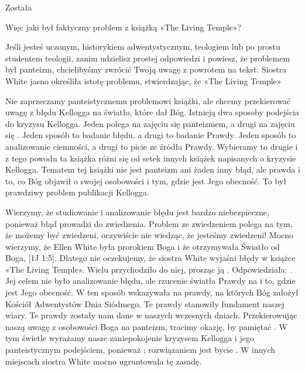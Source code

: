 Została 

Więc jaki był faktyczny problem z książką «The Living Temple»?

Jeśli jesteś uczonym, historykiem adwentystycznym, teologiem lub po prostu studentem teologii, zanim udzielisz prostej odpowiedzi i powiesz, że problemem był panteizm, chcielibyśmy zwrócić Twoją uwagę z powrotem na tekst. Siostra White jasno określiła istotę problemu, stwierdzając, że «The Living Temple» 

Nie zaprzeczamy panteistycznemu problemowi książki, ale chcemy przekierować uwagę z błędu Kellogga na światło, które dał Bóg. Istnieją dwa sposoby podejścia do kryzysu Kellogga. Jeden polega na zajęciu się panteizmem, a drugi na zajęciu się . Jeden sposób to badanie błędu, a drugi to badanie Prawdy. Jeden sposób to analizowanie ciemności, a drugi to picie ze źródła Prawdy. Wybieramy to drugie i z tego powodu ta książka różni się od setek innych książek napisanych o kryzysie Kellogga. Tematem tej książki nie jest panteizm ani żaden inny błąd, ale prawda i to, co Bóg objawił o swojej osobowości i tym, gdzie jest Jego obecność. To był prawdziwy problem publikacji Kellogga.

Wierzymy, że studiowanie i analizowanie błędu jest bardzo niebezpieczne, ponieważ błąd prowadzi do zwiedzenia. Problem ze zwiedzeniem polega na tym, że możemy być zwiedzeni, oczywiście nie wiedząc, że jesteśmy zwiedzeni! Mocno wierzymy, że Ellen White była prorokiem Boga i że otrzymywała Światło od Boga, [1J 1:5]. Dlatego nie oczekujemy, że siostra White wyjaśni błędy w książce «The Living Temple». Wielu przychodziło do niej, prosząc ją . Odpowiedziała: . Jej celem nie było analizowanie błędu, ale rzucenie światła Prawdy na  i to, gdzie jest Jego obecność. W ten sposób wskazywała na prawdy, na których Bóg założył Kościół Adwentystów Dnia Siódmego. Te prawdy stanowiły fundament naszej wiary. Te prawdy zostały nam dane w naszych wczesnych dniach. Przekierowując naszą uwagę z osobowości Boga na panteizm, tracimy okazję, by pamiętać . W tym świetle wyrażamy nasze zaniepokojenie kryzysem Kellogga i jego panteistycznym podejściem, ponieważ ; rozwiązaniem jest bycie . W innych miejscach siostra White mocno ugruntowała tę zasadę.

